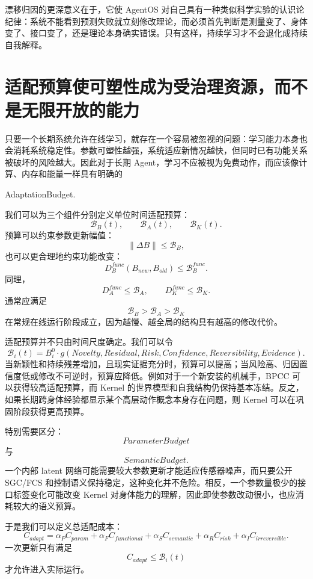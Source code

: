 漂移归因的更深意义在于，它使 AgentOS 对自己具有一种类似科学实验的认识论纪律：系统不能看到预测失败就立刻修改理论，而必须首先判断是测量变了、身体变了、接口变了，还是理论本身确实错误。只有这样，持续学习才不会退化成持续自我解释。

\section{适配预算使可塑性成为受治理资源，而不是无限开放的能力}

只要一个长期系统允许在线学习，就存在一个容易被忽视的问题：学习能力本身也会消耗系统稳定性。参数可塑性越强，系统适应新情况越快，但同时已有功能关系被破坏的风险越大。因此对于长期 Agent，学习不应被视为免费动作，而应该像计算、内存和能量一样具有明确的
\begin{statementbox}
AdaptationBudget.
\end{statementbox}

我们可以为三个组件分别定义单位时间适配预算：
\[
\mathcal B_B(t),
\qquad
\mathcal B_A(t),
\qquad
\mathcal B_K(t).
\]
预算可以约束参数更新幅值：
\[
\|\Delta B\|
\leq
\mathcal B_B,
\]
也可以更合理地约束功能改变：
\[
D_B^{func}
\left(
B_{new},B_{old}
\right)
\leq
\mathcal B_B^{func}.
\]
同理，
\[
D_A^{func}\leq\mathcal B_A,
\qquad
D_K^{func}\leq\mathcal B_K.
\]
通常应满足
\[
\mathcal B_B
>
\mathcal B_A
>
\mathcal B_K
\]
在常规在线运行阶段成立，因为越慢、越全局的结构具有越高的修改代价。

适配预算并不只由时间尺度确定。我们可以令
\[
\mathcal B_i(t)
=
B_i^0
\cdot
g
\left(
Novelty,
Residual,
Risk,
Confidence,
Reversibility,
Evidence
\right).
\]
当新颖性和持续残差增加，且现实证据充分时，预算可以提高；当风险高、归因置信度低或修改不可逆时，预算应降低。例如对于一个新安装的机械手，BPCC 可以获得较高适配预算，而 Kernel 的世界模型和自我结构仍保持基本冻结。反之，如果长期跨身体经验都显示某个高层动作概念本身存在问题，则 Kernel 可以在巩固阶段获得更高预算。

特别需要区分：
\[
ParameterBudget
\]
与
\[
SemanticBudget.
\]
一个内部 latent 网络可能需要较大参数更新才能适应传感器噪声，而只要公开 SGC/FCS 和控制语义保持稳定，这种变化并不危险。相反，一个参数量极少的接口标签变化可能改变 Kernel 对身体能力的理解，因此即使参数改动很小，也应消耗较大的语义预算。

于是我们可以定义总适配成本：
\[
C_{adapt}
=
\alpha_P C_{param}
+
\alpha_F C_{functional}
+
\alpha_S C_{semantic}
+
\alpha_R C_{risk}
+
\alpha_I C_{irreversible}.
\]
一次更新只有满足
\[
C_{adapt}\leq \mathcal B_i(t)
\]
才允许进入实际运行。


